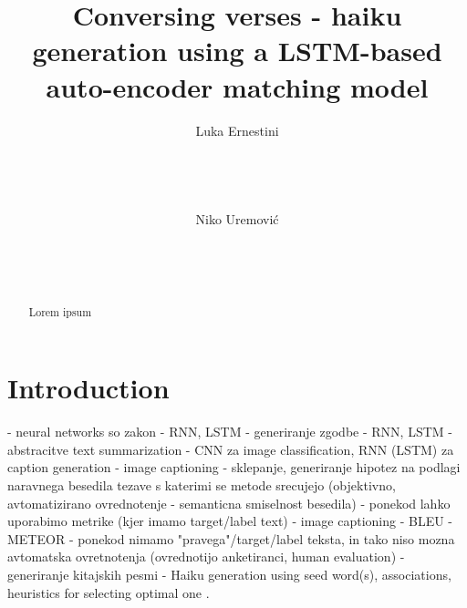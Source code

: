 \documentclass{acm_proc_article-sp}
\begin{document}
\title{Conversing verses - haiku generation using a LSTM-based auto-encoder matching model}

\author{
\alignauthor
Luka Ernestini\\
       \\
       \\
       \\

\alignauthor
Niko Uremović\\
       \\
       \\
       \\
}

\maketitle
\begin{abstract}

Lorem ipsum

\end{abstract}




\section{Introduction}

- neural networks so zakon
       - RNN, LSTM - generiranje zgodbe \cite{pawade2018story}
       - RNN, LSTM - abstracitve text summarization \cite{song2019abstractive}
       - CNN za image classification, RNN (LSTM) za caption generation - image captioning \cite{You_2016_CVPR}
       - sklepanje, generiranje hipotez na podlagi naravnega besedila  \cite{bhagavatula2020abductive}
tezave s katerimi se metode srecujejo (objektivno, avtomatizirano ovrednotenje - semanticna smiselnost besedila)
       - ponekod lahko uporabimo metrike (kjer imamo target/label text) - image captioning
              - BLEU \cite{papineni2002bleu}
              - METEOR \cite{banerjee2005meteor}
       - ponekod nimamo "pravega"/target/label teksta, in tako niso mozna avtomatska ovretnotenja (ovrednotijo anketiranci, human evaluation)
              - generiranje kitajskih pesmi \cite{zhang2014chinese}
              - Haiku generation using seed word(s), associations, heuristics for selecting optimal one \cite{netzer2009gaiku}.
\end{document}
